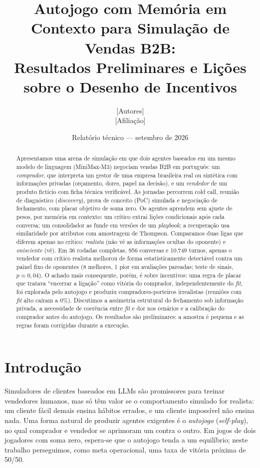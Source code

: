 \documentclass[11pt,a4paper]{article}
\title{\textbf{Autojogo com Memória em Contexto para Simulação de Vendas B2B:\\
Resultados Preliminares e Lições sobre o Desenho de Incentivos}}
\author{[Autores]\\\small [Afiliação]}
\date{Relatório técnico --- setembro de 2026}
\begin{document}
\maketitle

\begin{abstract}
Apresentamos uma arena de simulação em que dois agentes baseados em um mesmo modelo de linguagem (MiniMax-M3) negociam vendas B2B em português: um \emph{comprador}, que interpreta um gestor de uma empresa brasileira real ou sintética com informações privadas (orçamento, dores, papel na decisão), e um \emph{vendedor} de um produto fictício com ficha técnica verificável. As jornadas percorrem cold call, reunião de diagnóstico (\emph{discovery}), prova de conceito (PoC) simulada e negociação de fechamento, com placar objetivo de soma zero. Os agentes aprendem sem ajuste de pesos, por memória em contexto: um crítico extrai lições condicionais após cada conversa; um consolidador as funde em versões de um \emph{playbook}; a recuperação usa similaridade por atributos com amostragem de Thompson. Comparamos duas ligas que diferem apenas no crítico: \emph{realista} (não vê as informações ocultas do oponente) e \emph{onisciente} (vê). Em 36 rodadas completas, 956 conversas e 10.749 turnos, apenas o vendedor com crítico realista melhorou de forma estatisticamente detectável contra um painel fixo de oponentes (8 melhores, 1 pior em avaliações pareadas; teste de sinais, $p\approx0{,}04$). O achado mais consequente, porém, é sobre incentivos: uma regra de placar que tratava ``encerrar a ligação'' como vitória do comprador, independentemente do \emph{fit}, foi explorada pelo autojogo e produziu compradores-porteiros irrealistas (reuniões com \emph{fit} alto caíram a 0\%). Discutimos a assimetria estrutural do fechamento sob informação privada, a necessidade de coerência entre \emph{fit} e dor nos cenários e a calibração do comprador antes do autojogo. Os resultados são preliminares: a amostra é pequena e as regras foram corrigidas durante a execução.
\end{abstract}

\section{Introdução}

Simuladores de clientes baseados em LLMs são promissores para treinar vendedores humanos, mas só têm valor se o comportamento simulado for realista: um cliente fácil demais ensina hábitos errados, e um cliente impossível não ensina nada. Uma forma natural de produzir agentes exigentes é o \emph{autojogo} (\emph{self-play}), no qual comprador e vendedor se aprimoram um contra o outro. Em jogos de dois jogadores com soma zero, espera-se que o autojogo tenda a um equilíbrio; neste trabalho perseguimos, como meta operacional, uma taxa de vitória próxima de 50/50.
\end{document}
